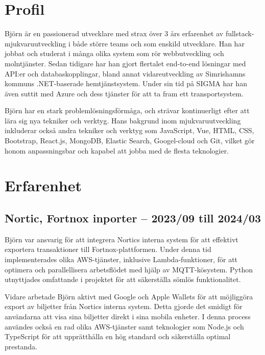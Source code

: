\documentclass{article}
\begin{document}
\noindent
\begin{minipage}[t]{0.7\textwidth}
\vspace{-20pt} %
\section*{\textcolor{colorBlue}{Profil}}
Björn är en passionerad utvecklare med strax över 3 års erfarenhet av fullstack-
mjukvaruutveckling i både större teams och som enskild utvecklare. 
Han har jobbat och studerat i många olika system som rör webbutveckling och molntjänster. 
Sedan tidigare har han gjort flertalet end-to-end lösningar med API:er och databaskopplingar, 
bland annat vidareutveckling av Simrishamns kommuns .NET-baserade hemtjänstsystem. 
Under sin tid på SIGMA har han även suttit med Azure och dess tjänster för att ta fram ett transportsystem.

\vspace{10pt}
Björn har en stark problemlösningsförmåga, och strävar kontinuerligt efter att lära 
sig nya tekniker och verktyg. Hans bakgrund inom mjukvaruutveckling inkluderar 
också andra tekniker och verktyg som JavaScript, Vue, HTML, CSS, Bootstrap, React.js, MongoDB,
 Elastic Search, Googel-cloud och Git, vilket gör honom anpassningsbar och 
 kapabel att jobba med de flesta teknologier.

\vspace{10pt} %
\section*{\textcolor{colorBlue}{Erfarenhet}}

\subsection*{\textcolor{colorTitelErfarenhet}{Nortic, Fortnox inporter – 2023/09 till 2024/03}}

Björn var ansvarig för att integrera Nortics interna system för att effektivt exportera transaktioner till Fortnox-plattformen. 
Under denna tid implementerades olika AWS-tjänster, inklusive Lambda-funktioner, för att optimera och parallellisera arbetsflödet med hjälp av MQTT-kösystem. 
Python utnyttjades omfattande i projektet för att säkerställa sömlös funktionalitet.

Vidare arbetade Björn aktivt med Google och Apple Wallets för att möjliggöra export av biljetter från Nortics interna system. 
Detta gjorde det smidigt för användarna att visa sina biljetter direkt i sina mobila enheter. 
I denna process användes också en rad olika AWS-tjänster samt teknologier som Node.js och TypeScript för att upprätthålla en hög standard och säkerställa optimal prestanda.


\end{minipage}
\end{document}
